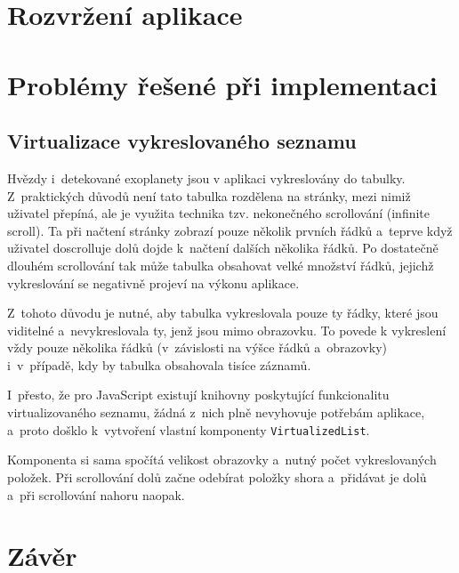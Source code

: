 \documentclass[a4paper,12pt]{article}
\def\code#1{\texttt{#1}}
\begin{document}
{{\section{Rozvržení aplikace}
\section{Problémy řešené při implementaci}

\subsection{Virtualizace vykreslovaného seznamu}

Hvězdy i~detekované exoplanety jsou v aplikaci vykreslovány do tabulky. Z~praktických důvodů není tato tabulka rozdělena na stránky, mezi nimiž uživatel přepíná, ale je využita technika tzv. nekonečného scrollování (infinite scroll). Ta při načtení stránky zobrazí pouze několik prvních řádků a~teprve když uživatel doscrolluje dolů dojde k~načtení dalších několika řádků. Po dostatečně dlouhém scrollování tak může tabulka obsahovat velké množství řádků, jejichž vykreslování se negativně projeví na výkonu aplikace.

Z~tohoto důvodu je nutné, aby tabulka vykreslovala pouze ty řádky, které jsou viditelné a~nevykreslovala ty, jenž jsou mimo obrazovku. To povede k vykreslení vždy pouze několika řádků (v~závislosti na výšce řádků a~obrazovky) i~v~případě, kdy by tabulka obsahovala tisíce záznamů.


I~přesto, že pro JavaScript existují knihovny poskytující funkcionalitu virtualizovaného seznamu, žádná z~nich plně nevyhovuje potřebám aplikace, a~proto došklo k~vytvoření vlastní komponenty \code{VirtualizedList}.



Komponenta si sama spočítá velikost obrazovky a~nutný počet vykreslovaných položek. Při scrollování dolů začne odebírat položky shora a~přidávat je dolů a~při scrollování nahoru naopak.


\clearpage\pagestyle{plain}
\section*{Závěr}

}}
\end{document}
